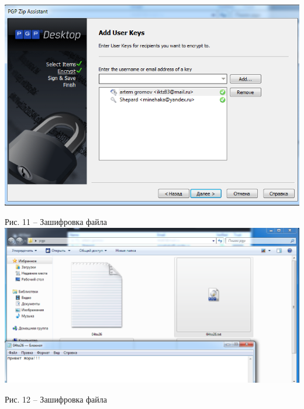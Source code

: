 \documentclass[a4paper,14pt]{extarticle}
\begin{document}
    \begin{center}
        \includegraphics[scale=0.6]{pics/11.png}

        Рис. 11 – Зашифровка файла
        \includegraphics[scale=0.4]{pics/12.png}

        Рис. 12 – Зашифровка файла
    \end{center}
\end{document}
